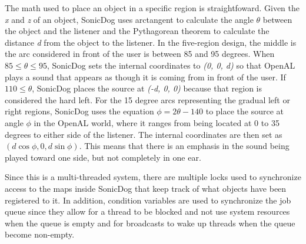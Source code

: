 The math used to place an object in a specific region is straightfoward. Given
the \emph{x} and \emph{z} of an object, SonicDog uses arctangent to calculate
the angle \begin{math}\theta\end{math} between the object and the listener and 
the Pythagorean theorem to calculate the distance \emph{d} from the object to 
the listener. In the five-region design, the middle is the arc considered in
front of the user is between 85 and 95 degrees. When
\begin{math}85\leq\theta\leq95\end{math}, SonicDog sets the internal
coordinates to \emph{(0, 0, d)} so that OpenAL plays a sound that appears as
though it is coming from in front of the user. If
\begin{math}110\leq\theta\end{math}, SonicDog places the source at 
\emph{(-d, 0, 0)} because that region is considered the hard left. For the 15 
degree arcs representing the gradual left or right regions, SonicDog uses the 
equation \begin{math}\phi=2\theta-140\end{math} to place the source at angle 
\begin{math}\phi\end{math} in the OpenAL world, where it ranges from being 
located at 0 to 35 degrees to either side of the listener. The internal 
coordinates are then set as \begin{math}(d\cos\phi, 0, d\sin\phi)\end{math}. 
This means that there is an emphasis in the sound being played toward one side, 
but not completely in one ear.

Since this is a multi-threaded system, there are multiple locks used to 
synchronize access to the maps inside SonicDog that keep track of what objects
have been registered to it. In addition, condition variables are used to
synchronize the job queue since they allow for a thread to be blocked and not
use system resources when the queue is empty and for broadcasts to wake up
threads when the queue become non-empty.


